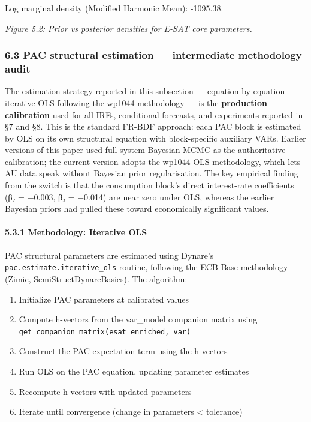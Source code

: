 \documentclass[
]{article}
\providecommand{\tightlist}{%
  \setlength{\itemsep}{0pt}\setlength{\parskip}{0pt}}
\begin{document}
Log marginal density (Modified Harmonic Mean): -1095.38.

\emph{Figure 5.2: Prior vs posterior densities for E-SAT core
parameters.}

\subsubsection{6.3 PAC structural estimation --- intermediate
methodology
audit}\label{pac-structural-estimation-intermediate-methodology-audit}

The estimation strategy reported in this subsection ---
equation-by-equation iterative OLS following the wp1044 methodology ---
is the \textbf{production calibration} used for all IRFs, conditional
forecasts, and experiments reported in §7 and §8. This is the standard
FR-BDF approach: each PAC block is estimated by OLS on its own
structural equation with block-specific auxiliary VARs. Earlier versions
of this paper used full-system Bayesian MCMC as the authoritative
calibration; the current version adopts the wp1044 OLS methodology,
which lets AU data speak without Bayesian prior regularisation. The key
empirical finding from the switch is that the consumption block's direct
interest-rate coefficients (β₂ = −0.003, β₃ = −0.014) are near zero
under OLS, whereas the earlier Bayesian priors had pulled these toward
economically significant values.

\paragraph{5.3.1 Methodology: Iterative
OLS}\label{methodology-iterative-ols}

PAC structural parameters are estimated using Dynare's
\texttt{pac.estimate.iterative\_ols} routine, following the ECB-Base
methodology (Zimic, SemiStructDynareBasics). The algorithm:

\begin{enumerate}
\def\labelenumi{\arabic{enumi}.}
\tightlist
\item
  Initialize PAC parameters at calibrated values
\item
  Compute h-vectors from the var\_model companion matrix using
  \texttt{get\_companion\_matrix(\textquotesingle{}esat\_enriched\textquotesingle{},\ \textquotesingle{}var\textquotesingle{})}
\item
  Construct the PAC expectation term using the h-vectors
\item
  Run OLS on the PAC equation, updating parameter estimates
\item
  Recompute h-vectors with updated parameters
\item
  Iterate until convergence (change in parameters \textless{} tolerance)
\end{enumerate}
\end{document}
